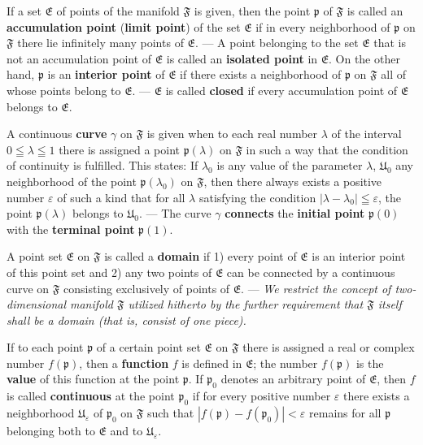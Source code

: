 \documentclass{article}
\begin{document}
If a set $\mathfrak{E}$ of points of the manifold $\mathfrak{F}$ is given, then the point $\mathfrak{p}$ of $\mathfrak{F}$ is called an \textbf{accumulation point} (\textbf{limit point}) of the set $\mathfrak{E}$ if in every neighborhood of $\mathfrak{p}$ on $\mathfrak{F}$ there lie infinitely many points of $\mathfrak{E}$. --- A point belonging to the set $\mathfrak{E}$ that is not an accumulation point of $\mathfrak{E}$ is called an \textbf{isolated point} in $\mathfrak{E}$. On the other hand, $\mathfrak{p}$ is an \textbf{interior point} of $\mathfrak{E}$ if there exists a neighborhood of $\mathfrak{p}$ on $\mathfrak{F}$ all of whose points belong to $\mathfrak{E}$. --- $\mathfrak{E}$ is called \textbf{closed} if every accumulation point of $\mathfrak{E}$ belongs to $\mathfrak{E}$.

A continuous \textbf{curve} $\gamma$ on $\mathfrak{F}$ is given when to each real number $\lambda$ of the interval $0 \leqq \lambda \leqq 1$ there is assigned a point $\mathfrak{p}(\lambda)$ on $\mathfrak{F}$ in such a way that the condition of continuity is fulfilled. This states: If $\lambda_0$ is any value of the parameter $\lambda$, $\mathfrak{U}_0$ any neighborhood of the point $\mathfrak{p}(\lambda_0)$ on $\mathfrak{F}$, then there always exists a positive number $\varepsilon$ of such a kind that for all $\lambda$ satisfying the condition $|\lambda - \lambda_0| \leqq \varepsilon$, the point $\mathfrak{p}(\lambda)$ belongs to $\mathfrak{U}_0$. --- The curve $\gamma$ \textbf{connects} the \textbf{initial point} $\mathfrak{p}(0)$ with the \textbf{terminal point} $\mathfrak{p}(1)$.

A point set $\mathfrak{E}$ on $\mathfrak{F}$ is called a \textbf{domain} if 1) every point of $\mathfrak{E}$ is an interior point of this point set and 2) any two points of $\mathfrak{E}$ can be connected by a continuous curve on $\mathfrak{F}$ consisting exclusively of points of $\mathfrak{E}$. --- \emph{We restrict the concept of two-dimensional manifold $\mathfrak{F}$ utilized hitherto by the further requirement that $\mathfrak{F}$ itself shall be a domain (that is, consist of one piece).}

If to each point $\mathfrak{p}$ of a certain point set $\mathfrak{E}$ on $\mathfrak{F}$ there is assigned a real or complex number $f(\mathfrak{p})$, then a \textbf{function} $f$ is defined in $\mathfrak{E}$; the number $f(\mathfrak{p})$ is the \textbf{value} of this function at the point $\mathfrak{p}$. If $\mathfrak{p}_0$ denotes an arbitrary point of $\mathfrak{E}$, then $f$ is called \textbf{continuous} at the point $\mathfrak{p}_0$ if for every positive number $\varepsilon$ there exists a neighborhood $\mathfrak{U}_\varepsilon$ of $\mathfrak{p}_0$ on $\mathfrak{F}$ such that $|f(\mathfrak{p}) - f(\mathfrak{p}_0)| < \varepsilon$ remains for all $\mathfrak{p}$ belonging both to $\mathfrak{E}$ and to $\mathfrak{U}_\varepsilon$.
\end{document}
